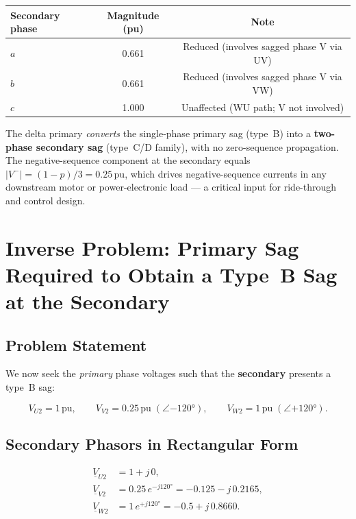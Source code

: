 \documentclass[a4paper,11pt]{article}
\begin{document}
\begin{center}
\begin{tabular}{lcc}
\toprule
\textbf{Secondary phase} & \textbf{Magnitude (pu)} & \textbf{Note} \\
\midrule
$a$ & 0.661 & Reduced (involves sagged phase V via UV) \\
$b$ & 0.661 & Reduced (involves sagged phase V via VW) \\
$c$ & 1.000 & Unaffected (WU path; V not involved) \\
\bottomrule
\end{tabular}
\end{center}

\noindent The delta primary \emph{converts} the single-phase primary sag
(type~B) into a \textbf{two-phase secondary sag} (type~C/D family),
with no zero-sequence propagation.  The negative-sequence component at
the secondary equals $|V^-|=(1-p)/3 = 0.25\,\mathrm{pu}$, which drives
negative-sequence currents in any downstream motor or power-electronic
load — a critical input for ride-through and control design.

\section{Inverse Problem: Primary Sag Required to Obtain a Type~B Sag at the Secondary}
\label{sec:inverse}

\subsection{Problem Statement}

We now seek the \emph{primary} phase voltages such that the \textbf{secondary}
presents a type~B sag:

\begin{equation}
V_{U2} = 1\,\mathrm{pu},\qquad
V_{V2} = 0.25\,\mathrm{pu}\;(\angle{-120°}),\qquad
V_{W2} = 1\,\mathrm{pu}\;(\angle{+120°}).
\label{eq:sec_target}
\end{equation}

\subsection{Secondary Phasors in Rectangular Form}

\begin{align}
\underline{V}_{U2} &= 1 + j\,0, \\
\underline{V}_{V2} &= 0.25\,e^{-j120°} = -0.125 - j\,0.2165, \\
\underline{V}_{W2} &= 1\,e^{+j120°}   = -0.5   + j\,0.8660.
\end{align}
\end{document}
